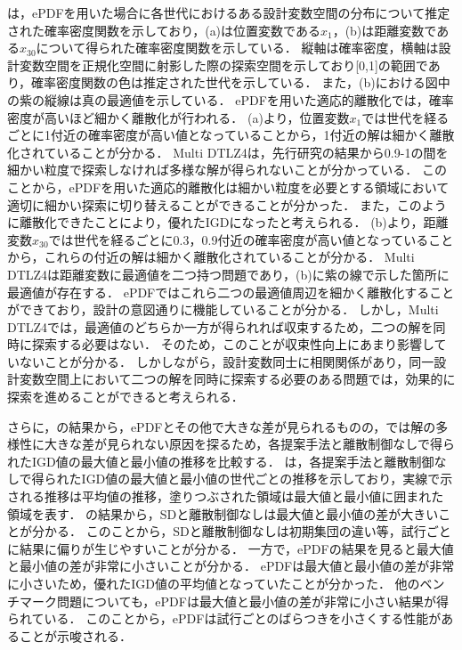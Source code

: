 \documentclass[../main/main]{subfiles}
\begin{document}
は，ePDFを用いた場合に各世代におけるある設計変数空間の分布について推定された確率密度関数を示しており，(a)は位置変数である$x_1$，(b)は距離変数である$x_{30}$について得られた確率密度関数を示している．
縦軸は確率密度，横軸は設計変数空間を正規化空間に射影した際の探索空間を示しており[0,1]の範囲であり，確率密度関数の色は推定された世代を示している．
また，(b)における図中の紫の縦線は真の最適値を示している．
ePDFを用いた適応的離散化では，確率密度が高いほど細かく離散化が行われる．
(a)より，位置変数$x_1$では世代を経るごとに1付近の確率密度が高い値となっていることから，1付近の解は細かく離散化されていることが分かる．
Multi DTLZ4は，先行研究の結果から0.9-1の間を細かい粒度で探索しなければ多様な解が得られないことが分かっている．
このことから，ePDFを用いた適応的離散化は細かい粒度を必要とする領域において適切に細かい探索に切り替えることができることが分かった．
また，このように離散化できたことにより，優れたIGDになったと考えられる．
(b)より，距離変数$x_{30}$では世代を経るごとに0.3，0.9付近の確率密度が高い値となっていることから，これらの付近の解は細かく離散化されていることが分かる．
Multi DTLZ4は距離変数に最適値を二つ持つ問題であり，(b)に紫の線で示した箇所に最適値が存在する．
ePDFではこれら二つの最適値周辺を細かく離散化することができており，設計の意図通りに機能していることが分かる．
しかし，Multi DTLZ4では，最適値のどちらか一方が得られれば収束するため，二つの解を同時に探索する必要はない．
そのため，このことが収束性向上にあまり影響していないことが分かる．
しかしながら，設計変数同士に相関関係があり，同一設計変数空間上において二つの解を同時に探索する必要のある問題では，効果的に探索を進めることができると考えられる．

さらに，の結果から，ePDFとその他で大きな差が見られるものの，では解の多様性に大きな差が見られない原因を探るため，各提案手法と離散制御なしで得られたIGD値の最大値と最小値の推移を比較する．
は，各提案手法と離散制御なしで得られたIGD値の最大値と最小値の世代ごとの推移を示しており，実線で示される推移は平均値の推移，塗りつぶされた領域は最大値と最小値に囲まれた領域を表す．
の結果から，SDと離散制御なしは最大値と最小値の差が大きいことが分かる．
このことから，SDと離散制御なしは初期集団の違い等，試行ごとに結果に偏りが生じやすいことが分かる．
一方で，ePDFの結果を見ると最大値と最小値の差が非常に小さいことが分かる．
ePDFは最大値と最小値の差が非常に小さいため，優れたIGD値の平均値となっていたことが分かった．
他のベンチマーク問題についても，ePDFは最大値と最小値の差が非常に小さい結果が得られている．
このことから，ePDFは試行ごとのばらつきを小さくする性能があることが示唆される．
\end{document}
